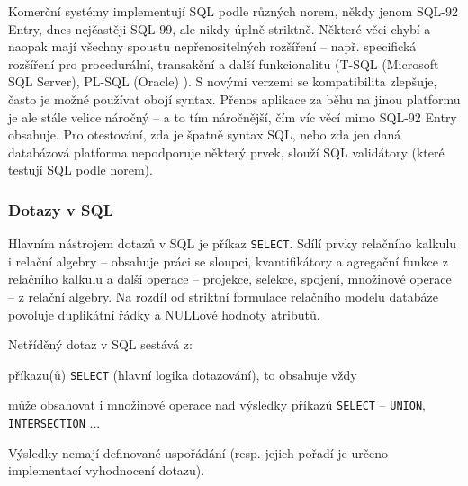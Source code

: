 Komerční systémy implementují SQL podle různých norem, někdy jenom SQL-92 Entry, dnes nejčastěji SQL-99, ale nikdy úplně striktně. Některé věci chybí a naopak mají všechny spoustu nepřenositelných rozšíření -- např. specifická rozšíření pro procedurální, transakční a další funkcionalitu (T-SQL (Microsoft SQL Server), PL-SQL (Oracle) ). S novými verzemi se kompatibilita zlepšuje, často je možné používat obojí syntax. Přenos aplikace za běhu na jinou platformu je ale stále velice náročný -- a to tím náročnější, čím víc věcí mimo SQL-92 Entry obsahuje. Pro otestování, zda je špatně syntax SQL, nebo zda jen daná databázová platforma nepodporuje některý prvek, slouží SQL validátory (které testují SQL podle norem).


\subsubsection*{Dotazy v SQL}

Hlavním nástrojem dotazů v SQL je příkaz \texttt{SELECT}. Sdílí prvky relačního kalkulu i relační algebry -- obsahuje práci se sloupci, kvantifikátory a agregační funkce z relačního kalkulu a další operace -- projekce, selekce, spojení, množinové operace -- z relační algebry. Na rozdíl od striktní formulace relačního modelu databáze povoluje duplikátní řádky a NULLové hodnoty atributů.

Netříděný dotaz v SQL sestává z:
\begin{pitemize}
    \item příkazu(ů) \texttt{SELECT} (hlavní logika dotazování), to obsahuje vždy
    \item může obsahovat i množinové operace nad výsledky příkazů \texttt{SELECT} -- \texttt{UNION}, \texttt{INTERSECTION} ...
\end{pitemize}
Výsledky nemají definované uspořádání (resp. jejich pořadí je určeno implementací vyhodnocení dotazu).

